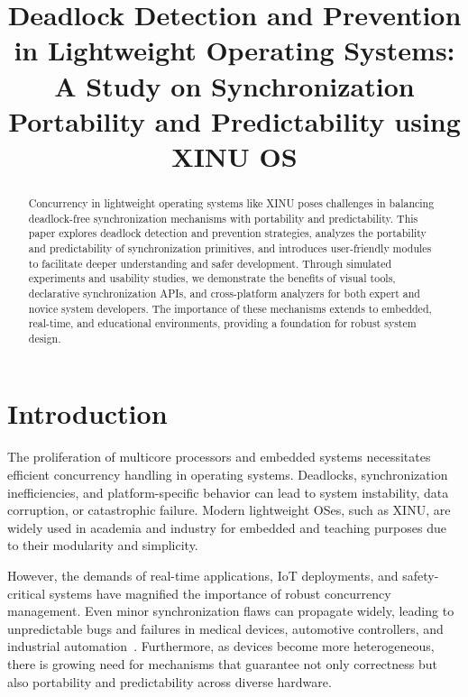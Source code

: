 \documentclass[conference,a4paper]{IEEEtran}
\begin{document}
\title{Deadlock Detection and Prevention in Lightweight Operating Systems: A Study on Synchronization Portability and Predictability using XINU OS}

\author{
}
\maketitle

\begin{abstract}
Concurrency in lightweight operating systems like XINU poses challenges in balancing deadlock-free synchronization mechanisms with portability and predictability. This paper explores deadlock detection and prevention strategies, analyzes the portability and predictability of synchronization primitives, and introduces user-friendly modules to facilitate deeper understanding and safer development. Through simulated experiments and usability studies, we demonstrate the benefits of visual tools, declarative synchronization APIs, and cross-platform analyzers for both expert and novice system developers. The importance of these mechanisms extends to embedded, real-time, and educational environments, providing a foundation for robust system design.
\end{abstract}

\IEEEpeerreviewmaketitle

\section{Introduction}
The proliferation of multicore processors and embedded systems necessitates efficient concurrency handling in operating systems. Deadlocks, synchronization inefficiencies, and platform-specific behavior can lead to system instability, data corruption, or catastrophic failure. Modern lightweight OSes, such as XINU, are widely used in academia and industry for embedded and teaching purposes due to their modularity and simplicity.

However, the demands of real-time applications, IoT deployments, and safety-critical systems have magnified the importance of robust concurrency management. Even minor synchronization flaws can propagate widely, leading to unpredictable bugs and failures in medical devices, automotive controllers, and industrial automation~\cite{wisconsin}. Furthermore, as devices become more heterogeneous, there is growing need for mechanisms that guarantee not only correctness but also portability and predictability across diverse hardware.
\end{document}
